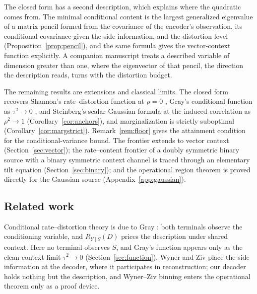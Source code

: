 \documentclass[11pt,onecolumn]{IEEEtran}
\begin{document}
The closed form has a second description, which explains where the
quadratic comes from. The minimal conditional content is the largest
generalized eigenvalue of a matrix pencil formed from the covariance of
the encoder's observation, its conditional covariance given the side
information, and the distortion level (Proposition~\ref{prop:pencil}),
and the same formula gives the vector-context function explicitly. A
companion manuscript \cite{bond2026vector} treats a described variable
of dimension greater than one, where the eigenvector of that pencil, the
direction the description reads, turns with the distortion budget.

The remaining results are extensions and classical limits. The closed
form recovers Shannon's rate--distortion function at $\rho=0$
\cite{shannon1959}, Gray's conditional function as $\tau^2\to0$
\cite{gray1973}, and Steinberg's scalar Gaussian formula at the induced
correlation as $\rho^2\to1$ (Corollary~\ref{cor:anchors}), and
marginalization is strictly suboptimal (Corollary~\ref{cor:margstrict}).
Remark~\ref{rem:floor} gives the attainment condition for the
conditional-variance bound. The frontier extends to vector context
(Section~\ref{sec:vector}); the rate--content frontier of a doubly
symmetric binary source with a binary symmetric context channel is traced
through an elementary tilt equation (Section~\ref{sec:binary}); and the
operational region theorem is proved directly for the Gaussian source
(Appendix~\ref{app:gaussian}).

\subsection*{Related work}

Conditional rate--distortion theory is due to Gray
\cite{gray1972tr,gray1973}: both terminals observe the conditioning
variable, and $R_{Y\mid S}(D)$ prices the description under shared
context. Here no terminal observes $S$, and Gray's function appears only
as the clean-context limit $\tau^2\to0$ (Section~\ref{sec:function}).
Wyner and Ziv \cite{wynerziv1976} place the side information at the
decoder, where it participates in reconstruction; our decoder holds
nothing but the description, and Wyner--Ziv binning enters the
operational theorem only as a proof device.
\end{document}
